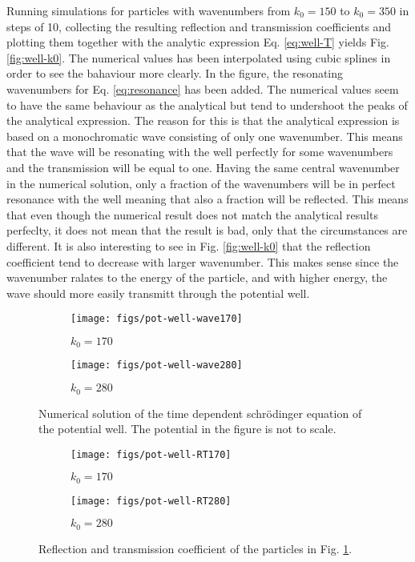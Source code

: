 Running simulations for particles with wavenumbers from $k_0 = 150$ to $k_0 = 350$ in steps of 10, collecting the resulting reflection and transmission coefficients and plotting them together with the analytic expression Eq. \eqref{eq:well-T} yields Fig. \ref{fig:well-k0}. The numerical values has been interpolated using cubic splines in order to see the bahaviour more clearly. In the figure, the resonating wavenumbers for Eq. \eqref{eq:resonance} has been added. The numerical values seem to have the same behaviour as the analytical but tend to undershoot the peaks of the analytical expression. The reason for this is that the analytical expression is based on a monochromatic wave consisting of only one wavenumber. This means that the wave will be resonating with the well perfectly for some wavenumbers and the transmission will be equal to one. Having the same central wavenumber in the numerical solution, only a fraction of the wavenumbers will be in perfect resonance with the well meaning that also a fraction will be reflected. This means that even though the numerical result does not match the analytical results perfeclty, it does not mean that the result is bad, only that the circumstances are different. It is also interesting to see in Fig. \ref{fig:well-k0} that the reflection coefficient tend to decrease with larger wavenumber. This makes sense since the wavenumber ralates to the energy of the particle, and with higher energy, the wave should more easily transmitt through the potential well.



\begin{figure}[H]
  \centering
  \begin{subfigure}{0.49\textwidth}
  \texttt{[image: figs/pot-well-wave170]}
  \caption{$k_0 = 170$}
  \end{subfigure}
  \begin{subfigure}{0.49\textwidth}
  \texttt{[image: figs/pot-well-wave280]}
  \caption{$k_0 = 280$}
  \end{subfigure}
  \caption{Numerical solution of the time dependent schrödinger equation of the potential well. The potential in the figure is not to scale.}
  \label{fig:well-wave}
\end{figure}


\begin{figure}[H]
  \centering
  \begin{subfigure}{0.49\textwidth}
  \texttt{[image: figs/pot-well-RT170]}
  \caption{$k_0 = 170$}
  \end{subfigure}
  \begin{subfigure}{0.49\textwidth}
  \texttt{[image: figs/pot-well-RT280]}
  \caption{$k_0 = 280$}
  \end{subfigure}
  \caption{Reflection and transmission coefficient of the particles in Fig. \ref{fig:well-wave}.}
  \label{fig:well-RT}
\end{figure}


